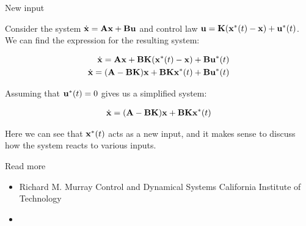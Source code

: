 \documentclass{beamer}
\begin{document}
\begin{frame}{New input}
	\begin{flushleft}
		
		Consider the system $\dot{\mathbf{x}} = \mathbf{A}\mathbf{x} + \mathbf{B}\mathbf{u}$ and control law $\mathbf{u} = \mathbf{K}(\mathbf{x}^*(t) - \mathbf{x}) + \mathbf{u}^*(t)$. We can find the expression for the resulting system:
		
		\begin{align}
			\dot{\mathbf{x}} = \mathbf{A}\mathbf{x} + \mathbf{B}\mathbf{K}(\mathbf{x}^*(t) - \mathbf{x}) + \mathbf{B}\mathbf{u}^*(t) \\
			\dot{\mathbf{x}} = (\mathbf{A}- \mathbf{B}\mathbf{K})\mathbf{x} +\mathbf{B}\mathbf{K}\mathbf{x}^*(t) + \mathbf{B}\mathbf{u}^*(t)
		\end{align}		
		
		Assuming that $\mathbf{u}^*(t) = 0$ gives us a simplified system:
		
		\begin{align}
			\dot{\mathbf{x}} =  (\mathbf{A}- \mathbf{B}\mathbf{K})\mathbf{x} +\mathbf{B}\mathbf{K}\mathbf{x}^*(t)
		\end{align}				
		
		Here we can see that $\mathbf{x}^*(t)$ acts as a new input, and it makes sense to discuss how the system reacts to various inputs.
		
	\end{flushleft}
\end{frame}



\begin{frame}{Read more}

\begin{itemize}
\item Richard M. Murray Control and Dynamical Systems California Institute of Technology 
\item {}
\end{itemize}
\end{frame}




\myqrframe
\end{document}
